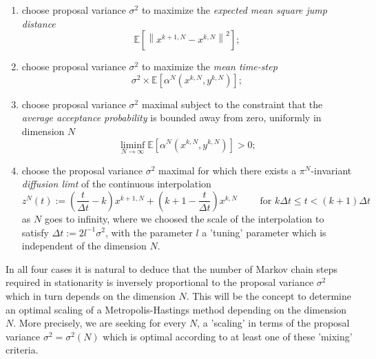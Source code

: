 \begin{enumerate}
 \item choose proposal variance $ \sigma^2 $ to maximize the \textit{expected mean square jump distance}
 \begin{equation}
  \label{CC:Mean Square jump distance}
  \mathbb{E}\left[ \left\| x^{k+1,N} - x^{k,N}  \right\|^2 \right];
 \end{equation}
 
 \item choose proposal variance $ \sigma^2 $ to maximize the \textit{mean time-step}
 \begin{equation}
  \label{CC:mean time-step}
  \sigma^2 \times \mathbb{E}\left[ \alpha^{N}\left(x^{k,N},y^{k,N}\right) \right];
 \end{equation}
 
 \item choose proposal variance $ \sigma^2 $ maximal subject to the constraint that the \textit{average acceptance probability} is bounded away from zero, uniformly in dimension $N$
 \begin{equation}
  \label{CC:average acceptance probability}
  \liminf_{N \to \infty} \mathbb{E} \left[  \alpha^{N}\left(x^{k,N},y^{k,N}\right) \right] > 0;
 \end{equation}
 
 \item choose the proposal variance $ \sigma^2 $ maximal for which there exists a $ \pi^{N} $-invariant \textit{diffusion limt} of the continuous interpolation
 \begin{equation}
  \label{CC:Continuous interpolation}
  z^{N}(t) := \left( \frac{t}{\Delta t} -k \right) x^{k+1,N} + \left( k+1 - \frac{t}{\Delta t} \right) x^{k,N} \qquad \text{ for } k \Delta t \leq t < (k+1)\Delta t 
  \end{equation}
  as $N$ goes to infinity, where we choosed the scale of the interpolation to satisfy $ \Delta t := 2 l^{-1} \sigma^2  $, with the parameter $l$ a 'tuning' parameter which is independent of the dimension $N$.
 
\end{enumerate}

In all four cases it is natural to deduce that the number of Markov chain steps
required in stationarity is inversely proportional to the proposal variance $ \sigma^2 $ which in turn depends on the dimension $N$. This will be the concept to determine an optimal scaling of a Metropolis-Hastings method depending on the dimension $N$. More precisely, we are seeking for every $N$, a 'scaling' in terms of the proposal variance $ \sigma^2 = \sigma^2 (N) $ which is optimal according to at least one of these 'mixing' criteria.

